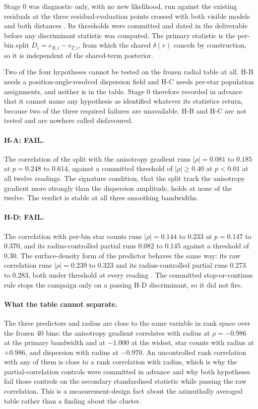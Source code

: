 \documentclass[11pt]{article}
\begin{document}
Stage 0 was diagnostic only, with no new likelihood, run against the existing residuals at the three residual-evaluation points crossed with both visible models and both distances \citep{AXIStage0Report2026}. Its thresholds were committed and dated in the deliverable before any discriminant statistic was computed. The primary statistic is the per-bin split $D_i = e_{R,i} - e_{T,i}$, from which the shared $\delta(r)$ cancels by construction, so it is independent of the shared-term posterior.

Two of the four hypotheses cannot be tested on the frozen radial table at all. H-B needs a position-angle-resolved dispersion field and H-C needs per-star population assignments, and neither is in the table. Stage 0 therefore recorded in advance that it cannot name any hypothesis as identified whatever its statistics return, because two of the three required failures are unavailable. H-B and H-C are not tested and are nowhere called disfavoured.

\paragraph{H-A: FAIL.} The correlation of the split with the anisotropy gradient runs $|\rho| = 0.081$ to $0.185$ at $p = 0.248$ to $0.614$, against a committed threshold of $|\rho| \geq 0.40$ at $p < 0.01$ at all twelve readings. The signature condition, that the split track the anisotropy gradient more strongly than the dispersion amplitude, holds at none of the twelve. The verdict is stable at all three smoothing bandwidths.

\paragraph{H-D: FAIL.} The correlation with per-bin star counts runs $|\rho| = 0.144$ to $0.233$ at $p = 0.147$ to $0.370$, and its radius-controlled partial runs 0.082 to 0.145 against a threshold of 0.30. The surface-density form of the predictor behaves the same way: its raw correlation runs $|\rho| = 0.239$ to $0.323$ and its radius-controlled partial runs 0.273 to 0.283, both under threshold at every reading \citep{AXIStage0Report2026}. The committed stop-or-continue rule stops the campaign only on a passing H-D discriminant, so it did not fire.

\paragraph{What the table cannot separate.} The three predictors and radius are close to the same variable in rank space over the frozen 40 bins: the anisotropy gradient correlates with radius at $\rho = -0.986$ at the primary bandwidth and at $-1.000$ at the widest, star counts with radius at $+0.986$, and dispersion with radius at $-0.970$. An uncontrolled rank correlation with any of them is close to a rank correlation with radius, which is why the partial-correlation controls were committed in advance and why both hypotheses fail those controls on the secondary standardised statistic while passing the raw correlation. This is a measurement-design fact about the azimuthally averaged table rather than a finding about the cluster.
\end{document}
